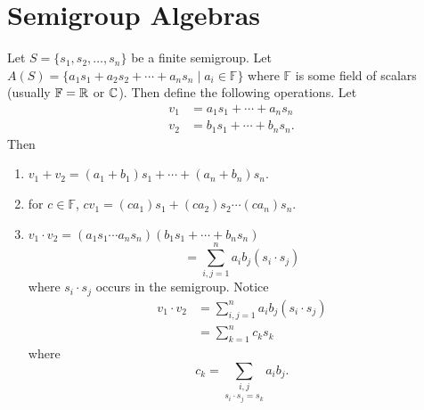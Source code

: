

\section{Semigroup Algebras}
\label{sec:3.6}


Let $S = \{ s_1,s_2,\ldots,s_n \}$ be a finite semigroup.  
Let $A(S) = \{ a_1s_1 + a_2s_2 + \cdots + a_ns_n \mid a_i \in \mathbb{F} \}$
where $\mathbb{F}$ is some field of scalars (usually $\mathbb{F} = \mathbb{R}$ or $\mathbb{C}$).  
Then define the following operations.  
Let
\[
\begin{aligned}
       v_1 &= a_1s_1 + \cdots + a_ns_n             \\
       v_2 &= b_1s_1 + \cdots + b_ns_n.
\end{aligned}
\]
Then
%
\begin{enumerate}
\item[(1)] $v_1 + v_2 = (a_1+b_1)s_1 + \cdots + (a_n+b_n)s_n$.
\item[(2)] for $c \in \mathbb{F}$, $cv_1 = (ca_1)s_1 + (ca_2)s_2 \cdots
(ca_n)s_n$.
\item[(3)] $v_1 \cdot v_2 = (a_1s_1 \cdots a_ns_n)(b_1s_1 + \cdots +
b_ns_n)$
\[
     = \sum^n_{i,j=1} a_ib_j (s_i \cdot s_j)
\]
where $s_i \cdot s_j$ occurs in the semigroup.  
Notice
\[
\begin{aligned}
       v_1 \cdot v_2 &= \sum^n_{i,j=1} a_ib_j(s_i \cdot s_j)   \\
       &= \sum^n_{k=1} c_ks_k
\end{aligned}
\]
where
\[
     c_k = \underset{s_i\cdot s_j=s_k}{\sum_{i,j}} a_ib_j.
\]
\end{enumerate}
%

